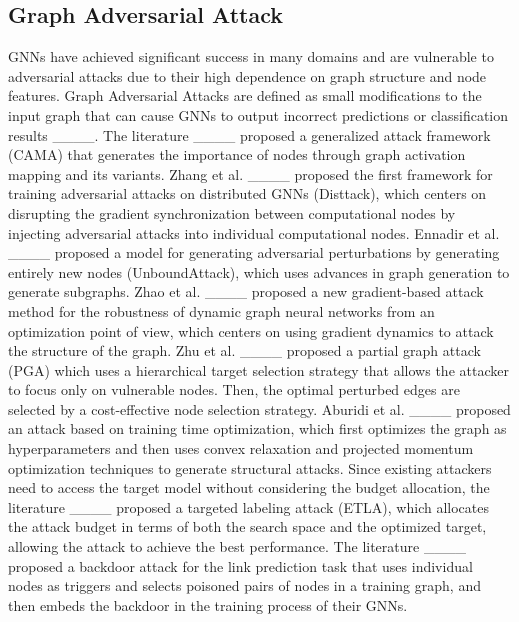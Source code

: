 \subsection{Graph Adversarial Attack}\label{2.3}

GNNs have achieved significant success in many domains and are vulnerable to adversarial attacks due to their high dependence on graph structure and node features. Graph Adversarial Attacks are defined as small modifications to the input graph that can cause GNNs to output incorrect predictions or classification results ____.
The literature ____ proposed a generalized attack framework (CAMA) that generates the importance of nodes through graph activation mapping and its variants.
Zhang et al. ____ proposed the first framework for training adversarial attacks on distributed GNNs (Disttack), which centers on disrupting the gradient synchronization between computational nodes by injecting adversarial attacks into individual computational nodes. Ennadir et al. ____ proposed a model for generating adversarial perturbations by generating entirely new nodes (UnboundAttack), which uses advances in graph generation to generate subgraphs. Zhao et al. ____ proposed a new gradient-based attack method for the robustness of dynamic graph neural networks from an optimization point of view, which centers on using gradient dynamics to attack the structure of the graph. Zhu et al. ____ proposed a partial graph attack (PGA) which uses a hierarchical target selection strategy that allows the attacker to focus only on vulnerable nodes. Then, the optimal perturbed edges are selected by a cost-effective node selection strategy. Aburidi et al. ____ proposed an attack based on training time optimization, which first optimizes the graph as hyperparameters and then uses convex relaxation and projected momentum optimization techniques to generate structural attacks. Since existing attackers need to access the target model without considering the budget allocation, the literature ____ proposed a targeted labeling attack (ETLA), which allocates the attack budget in terms of both the search space and the optimized target, allowing the attack to achieve the best performance. The literature ____ proposed a backdoor attack for the link prediction task that uses individual nodes as triggers and selects poisoned pairs of nodes in a training graph, and then embeds the backdoor in the training process of their GNNs.